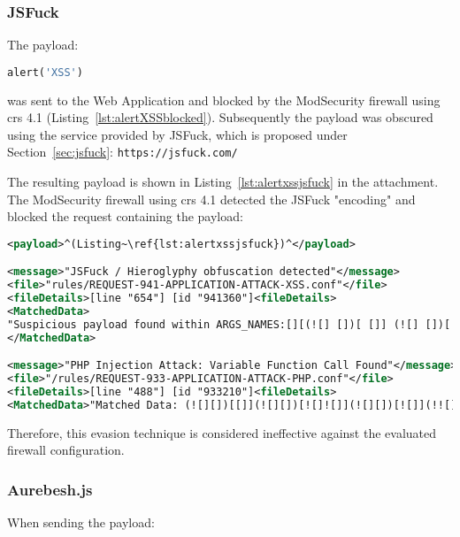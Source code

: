 \subsubsection{JSFuck}
\label{sec:jsfucksingleiter}
The payload: 

\begin{lstlisting}[style=basicStyle, language=Python]
alert('XSS')
\end{lstlisting}
was sent to the Web Application and blocked by the ModSecurity firewall using \acrshort{crs} 4.1 (Listing~\ref{lst:alertXSSblocked}). Subsequently the payload was obscured using the service provided by JSFuck, which is proposed under Section~\ref{sec:jsfuck}: \verb|https://jsfuck.com/| 

The resulting payload is shown in Listing~\ref{lst:alertxssjsfuck} in the attachment. The ModSecurity firewall using \acrshort{crs} 4.1 detected the JSFuck "encoding" and blocked the request containing the payload:

\begin{lstlisting}[style=ruleStyle, language=XML, caption=alert('XSS') in JSFuck blocked, label={lst:alertxssjsfuckblocked}]
<payload>^(Listing~\ref{lst:alertxssjsfuck})^</payload>

<message>"JSFuck / Hieroglyphy obfuscation detected"</message>
<file>"rules/REQUEST-941-APPLICATION-ATTACK-XSS.conf"</file>
<fileDetails>[line "654"] [id "941360"]<fileDetails>
<MatchedData>
"Suspicious payload found within ARGS_NAMES:[][(![] [])[ []] (![] [])[! [] ! []] (![] [])[ ! []] (!![] [])[ []]][([][(![] [])[ []] (![] [])[! [] ! []] (![] [])[ ! []] (!![] [])[ []]] [])[ (11337 characters omitted)"
</MatchedData>

<message>"PHP Injection Attack: Variable Function Call Found"</message>
<file>"/rules/REQUEST-933-APPLICATION-ATTACK-PHP.conf"</file>
<fileDetails>[line "488"] [id "933210"]<fileDetails>
<MatchedData>"Matched Data: (![][])[[]](![][])[![]![]](![][])[![]](!![][])[[]]][([][(![][])[[]](![][])[![]![]](![][])[![]](!![][])[[]]][])[![]![]![]](!![][][(![][])[[]](![][])[![]![]](![][])[![]](!![][])[[]]])[![][ (21516 characters omitted)"</MatchedData>
\end{lstlisting}
Therefore, this evasion technique is considered ineffective against the evaluated firewall configuration.


\subsubsection{Aurebesh.js}
\label{sec:aurebeshevaluation}
When sending the payload: 

